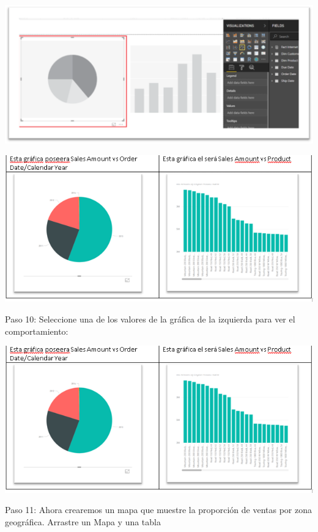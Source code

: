 \documentclass[12pt,letterpaper]{article}
\begin{document}
\begin{center}
    \includegraphics[width=16cm]{img/9.png}  
\end{center}
\begin{center}
    \includegraphics[width=16cm]{img/10.png}  
\end{center}
Paso 10: Seleccione una de los valores de la gráfica de la izquierda para ver el comportamiento:
\begin{center}
    \includegraphics[width=16cm]{img/10.png}  
\end{center}
Paso 11: Ahora crearemos un mapa que muestre la proporción de ventas por zona geográfica. Arrastre un Mapa y una tabla
\end{document}

